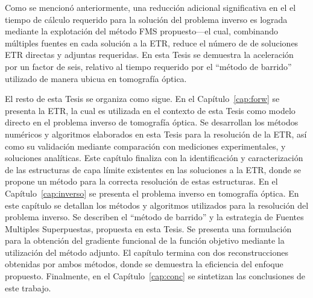Como se mencionó anteriormente, una reducción adicional significativa en el
el tiempo de cálculo requerido para la solución del problema inverso es
lograda mediante la explotación del método FMS propuesto---el cual, combinando
múltiples fuentes en cada solución a la ETR, reduce el número de
de soluciones ETR directas y adjuntas requeridas. 
En esta Tesis se demuestra la aceleración por un factor de seis, 
relativo al tiempo requerido por el ``método de barrido'' 
utilizado de manera ubicua en tomografía óptica.

El resto de esta Tesis se organiza como sigue. 
En el Capítulo~\ref{cap:forw} se presenta 
la ETR, la cual es utilizada en el contexto 
de esta Tesis como modelo directo 
en el problema inverso de tomografía óptica. Se desarrollan 
los métodos numéricos y algoritmos elaborados en esta Tesis 
para la resolución de la ETR, así como su validación 
mediante comparación con mediciones experimentales, y soluciones analíticas. Este capítulo finaliza con la identificación y 
caracterización de las estructuras de capa límite existentes 
en las soluciones a la ETR, donde se propone un método para 
la correcta resolución de estas estructuras. 
En el Capítulo~\ref{cap:inverso} se presenta el problema inverso 
en tomografía óptica. En este capítulo se detallan los métodos 
y algoritmos utilizados para la resolución del problema inverso. 
Se describen el ``método de barrido'' y la estrategia de Fuentes Multiples Superpuestas, propuesta en esta Tesis. 
Se presenta una formulación para la obtención del gradiente 
funcional de la función objetivo mediante la utilización del método adjunto. El capítulo termina con dos 
reconstrucciones obtenidas por ambos métodos, donde se demuestra 
la eficiencia del enfoque propuesto. Finalmente, en el Capítulo~\ref{cap:conc} se sintetizan las conclusiones de este trabajo.

\pagestyle{empty}

